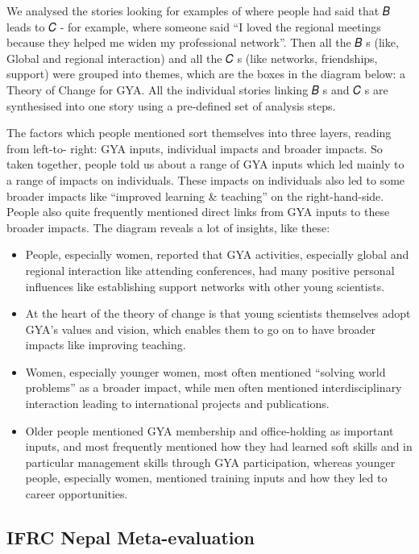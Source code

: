 \documentclass[
]{book}
\begin{document}
We analysed the stories looking for examples of where people had said that 𝐵 leads to 𝐶 -
for example, where someone said ``I loved the regional meetings because they helped me
widen my professional network''. Then all the 𝐵 s (like, Global and regional interaction) and
all the 𝐶 s (like networks, friendships, support) were grouped into themes, which are the
boxes in the diagram below: a Theory of Change for GYA. All the individual stories linking 𝐵 s and 𝐶 s are synthesised into one story using a pre-defined set of analysis steps.

The factors which people mentioned sort themselves into three layers, reading from left-to-
right: GYA inputs, individual impacts and broader impacts. So taken together, people told
us about a range of GYA inputs which led mainly to a range of impacts on individuals. These
impacts on individuals also led to some broader impacts like ``improved learning \&
teaching'' on the right-hand-side. People also quite frequently mentioned direct links from
GYA inputs to these broader impacts. The diagram reveals a lot of insights, like these:

\begin{itemize}
\item
  People, especially women, reported that GYA activities, especially global and regional
  interaction like attending conferences, had many positive personal influences like
  establishing support networks with other young scientists.
\item
  At the heart of the theory of change is that young scientists themselves adopt GYA's
  values and vision, which enables them to go on to have broader impacts like improving
  teaching.
\item
  Women, especially younger women, most often mentioned ``solving world problems''
  as a broader impact, while men often mentioned interdisciplinary interaction leading
  to international projects and publications.
\item
  Older people mentioned GYA membership and office-holding as important inputs, and
  most frequently mentioned how they had learned soft skills and in particular
  management skills through GYA participation, whereas younger people, especially
  women, mentioned training inputs and how they led to career opportunities.
\end{itemize}

\hypertarget{ifrc-nepal-meta-evaluation}{%
\subsection{IFRC Nepal Meta-evaluation}\label{ifrc-nepal-meta-evaluation}}
\end{document}
